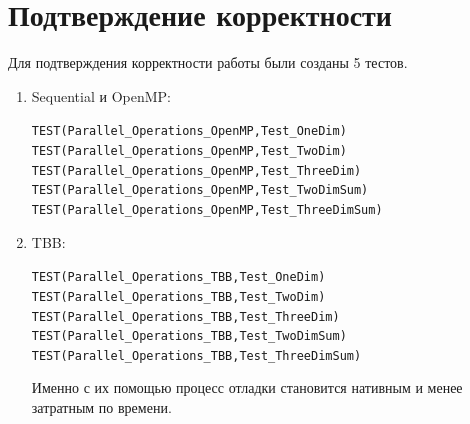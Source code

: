 \documentclass{report}
\begin{document}
\section*{Подтверждение корректности}
Для подтверждения корректности работы были созданы 5 тестов.
\begin{enumerate}
\item Sequential и OpenMP: 
        \begin{alltt}
        TEST(Parallel_Operations_OpenMP, Test_OneDim) {}
        TEST(Parallel_Operations_OpenMP, Test_TwoDim) {}
        TEST(Parallel_Operations_OpenMP, Test_ThreeDim) {}
        TEST(Parallel_Operations_OpenMP, Test_TwoDimSum) {}
        TEST(Parallel_Operations_OpenMP, Test_ThreeDimSum) {}
        \end{alltt}
\item TBB:
        \begin{alltt}
        TEST(Parallel_Operations_TBB, Test_OneDim) {}
        TEST(Parallel_Operations_TBB, Test_TwoDim) {}
        TEST(Parallel_Operations_TBB, Test_ThreeDim) {}
        TEST(Parallel_Operations_TBB, Test_TwoDimSum) {}
        TEST(Parallel_Operations_TBB, Test_ThreeDimSum) {}
        \end{alltt}        
        Именно с их помощью процесс отладки становится нативным и менее затратным по времени.
\end{enumerate}
\newpage
\end{document}

